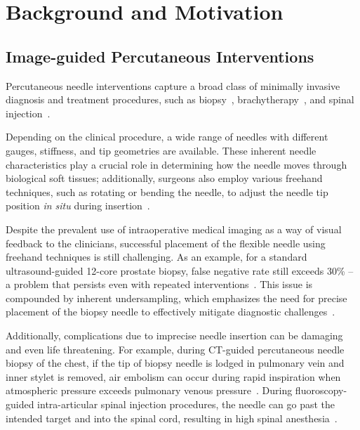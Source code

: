 \chapter{Background and Motivation} \label{chap:chap-1}

\section{Image-guided Percutaneous Interventions}
\label{sec:image-guided-percutanous-interventions}

Percutaneous needle interventions capture a broad class of minimally invasive diagnosis and treatment procedures, such as biopsy~\parencite{bourgouinImageGuidedPercutaneousLung2021, birginCoreNeedleBiopsy2020, shethSocietyInterventionalRadiology2020, wuComplicationsCTGuidedPercutaneous2011}, brachytherapy~\parencite{chargariBrachytherapyOverviewClinicians2019, ragdeModernProstateBrachytherapy2000, wanBrachytherapyNeedleDeflection2005, podderVivoMotionForce2006}, and spinal injection~\parencite{wonFacetJointInjections2020,manchikantiEpiduralInterventionsManagement2021, carassitiEpiduralSteroidInjections2021, silbergleitImagingguidedInjectionTechniques2001}.

Depending on the clinical procedure, a wide range of needles with different gauges, stiffness, and tip geometries are available. These inherent needle characteristics play a crucial role in determining how the needle moves through biological soft tissues; additionally, surgeons also employ various freehand techniques, such as rotating or bending the needle, to adjust the needle tip position \textit{in situ} during insertion~\parencite{calthorpeHistorySpinalNeedles2004,tsenNeedlesUsedSpinal2006,fritzAugmentedRealityVisualization2012}.

Despite the prevalent use of intraoperative medical imaging as a way of visual feedback to the clinicians, successful placement of the flexible needle using freehand techniques is still challenging. As an example, for a standard ultrasound-guided 12-core prostate biopsy, false negative rate still exceeds 30\% -- a problem that persists even with repeated interventions~\parencite{serefogluHowReliable12Core2013}. This issue is compounded by inherent undersampling, which emphasizes the need for precise placement of the biopsy needle to effectively mitigate diagnostic challenges~\parencite{prestiProstateBiopsyCurrent2007}.

Additionally, complications due to imprecise needle insertion can be damaging and even life threatening. For example, during CT-guided percutaneous needle biopsy of the chest, if the tip of biopsy needle is lodged in pulmonary vein and inner stylet is removed, air embolism can occur during rapid inspiration when atmospheric pressure exceeds pulmonary venous pressure~\parencite{wuComplicationsCTGuidedPercutaneous2011}. During fluoroscopy-guided intra-articular spinal injection procedures, the needle can go past the intended target and into the spinal cord, resulting in high spinal anesthesia~\parencite{bogdukComplicationsSpinalDiagnostic2008}.

